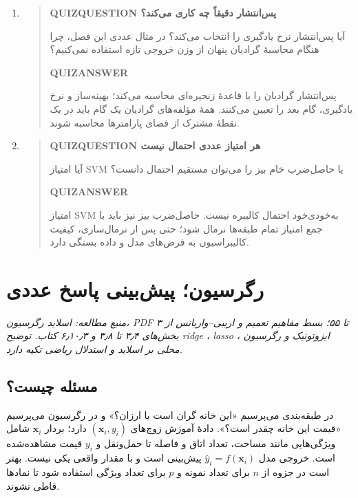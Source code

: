 \begin{enumerate}
\begin{quote}
\end{quote}
\item\begin{quote}\textbf{QUIZQUESTION پس‌انتشار دقیقاً چه کاری می‌کند؟}\par 
آیا پس‌انتشار نرخ یادگیری را انتخاب می‌کند؟ در مثال عددی این فصل، چرا هنگام محاسبهٔ گرادیان پنهان از وزن خروجی تازه استفاده نمی‌کنیم؟
\par\textbf{QUIZANSWER}\par پس‌انتشار گرادیان را با قاعدهٔ زنجیره‌ای محاسبه می‌کند؛ بهینه‌ساز و نرخ یادگیری، گام بعد را تعیین می‌کنند. همهٔ مؤلفه‌های گرادیان یک گام باید در یک نقطهٔ مشترک از فضای پارامترها محاسبه شوند.\par 
\end{quote}
\item\begin{quote}\textbf{QUIZQUESTION هر امتیاز عددی احتمال نیست}\par 
آیا امتیاز SVM یا حاصل‌ضرب خام بیز را می‌توان مستقیم احتمال دانست؟
\par\textbf{QUIZANSWER}\par امتیاز SVM به‌خودی‌خود احتمال کالیبره نیست. حاصل‌ضرب بیز نیز باید با جمع امتیاز تمام طبقه‌ها نرمال شود؛ حتی پس از نرمال‌سازی، کیفیت کالیبراسیون به فرض‌های مدل و داده بستگی دارد.\par 
\end{quote}
\end{enumerate}


\chapter{رگرسیون؛ پیش‌بینی پاسخ عددی}
\textit{منبع مطالعه: اسلاید رگرسیون، PDF ۳ تا ۵۵؛ بسط مفاهیم تعمیم و اریبی–واریانس از بخش‌های ۳٫۴ تا ۳٫۸ و ۶٫۱۰٫۳ کتاب. توضیح ridge ، lasso ، ایزوتونیک و رگرسیون محلی بر اسلاید و استدلال ریاضی تکیه دارد.}\par 
\section{مسئله چیست؟}

در طبقه‌بندی می‌پرسیم «این خانه گران است یا ارزان؟» و در رگرسیون می‌پرسیم «قیمت این خانه چقدر است؟». دادهٔ آموزش زوج‌های \((\boldsymbol{x}_i,y_i)\) دارد؛ بردار \(\boldsymbol{x}_i\) شامل ویژگی‌هایی مانند مساحت، تعداد اتاق و فاصله تا حمل‌ونقل و \(y_i\) قیمت مشاهده‌شده است. خروجی مدل \(\widehat y_i=f(\boldsymbol{x}_i)\) پیش‌بینی است و با مقدار واقعی یکی نیست. بهتر است در جزوه از \(n\) برای تعداد نمونه و \(p\) برای تعداد ویژگی استفاده شود تا نمادها قاطی نشوند.

